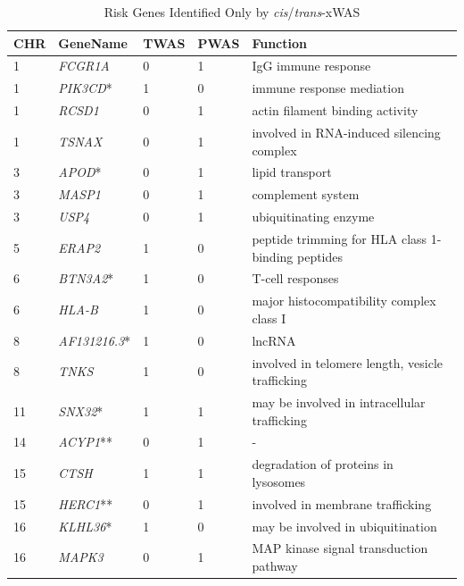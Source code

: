 \begin{table}[H]\centering
\caption{Risk Genes Identified Only by \textit{cis}/\textit{trans}-xWAS}
\begin{tabular}{lllll}
  \toprule
    CHR & GeneName & TWAS & PWAS & Function\\ 
    \midrule
    1 & \textit{FCGR1A} &   0 &   1 &   IgG immune response \\ 
    1 & \textit{PIK3CD}* &   1 &   0 &  immune response mediation   \\ 
    1 & \textit{RCSD1} &   0 &   1 &  actin filament binding activity  \\ 
    1 & \textit{TSNAX} &   0 &   1 &   involved in RNA-induced silencing complex \\ 
    3 & \textit{APOD}* &   0 &   1 &   lipid transport \\ 
    3 & \textit{MASP1} &   0 &   1 &  complement system  \\ 
    3 & \textit{USP4} &   0 &   1 &   ubiquitinating enzyme \\ 
    5 & \textit{ERAP2} &   1 &   0 &   peptide trimming for HLA class 1-binding peptides \\ 
    6 & \textit{BTN3A2}* &   1 &   0 &   T-cell responses  \\ 
    6 & \textit{HLA-B} &   1 &   0 &  major histocompatibility complex class I  \\ 
    8 & \textit{AF131216.3}* &   1 &   0 &  lncRNA  \\ 
    8 & \textit{TNKS} &   1 &   0 &   involved in telomere length, vesicle trafficking \\ 
   11 & \textit{SNX32}* &   1 &   1 &  may be involved in intracellular trafficking  \\ 
   14 & \textit{ACYP1}** &   0 &   1 &  -  \\ 
   15 & \textit{CTSH} &   1 &   1 &   degradation of proteins in lysosomes \\ 
   15 & \textit{HERC1}** &   0 &   1 &  involved in membrane trafficking  \\ 
   16 & \textit{KLHL36}* &   1 &   0 &  may be involved in ubiquitination  \\ 
   16 & \textit{MAPK3} &   0 &   1 & MAP kinase signal transduction pathway   \\ 

\end{tabular}
\end{table}
